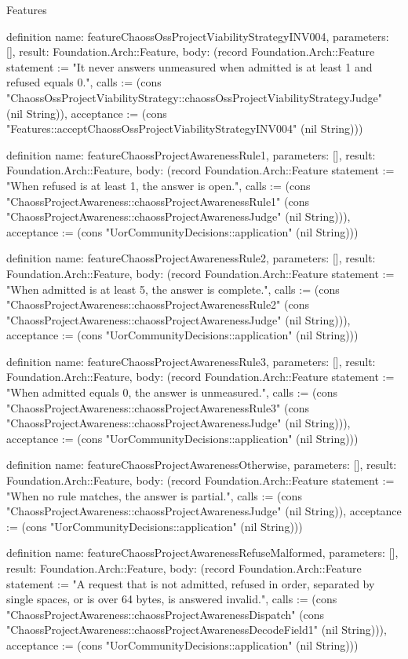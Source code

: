 \begin{lexlean}{Features}
\begin{semanticmodule}
definition{
  name: featureChaossOssProjectViabilityStrategyINV004,
  parameters: [],
  result: Foundation.Arch::Feature,
  body: (record Foundation.Arch::Feature {statement := "It never answers unmeasured when admitted is at least 1 and refused equals 0.", calls := (cons "ChaossOssProjectViabilityStrategy::chaossOssProjectViabilityStrategyJudge" (nil String)), acceptance := (cons "Features::acceptChaossOssProjectViabilityStrategyINV004" (nil String))})
}

definition{
  name: featureChaossProjectAwarenessRule1,
  parameters: [],
  result: Foundation.Arch::Feature,
  body: (record Foundation.Arch::Feature {statement := "When refused is at least 1, the answer is open.", calls := (cons "ChaossProjectAwareness::chaossProjectAwarenessRule1" (cons "ChaossProjectAwareness::chaossProjectAwarenessJudge" (nil String))), acceptance := (cons "UorCommunityDecisions::application" (nil String))})
}

definition{
  name: featureChaossProjectAwarenessRule2,
  parameters: [],
  result: Foundation.Arch::Feature,
  body: (record Foundation.Arch::Feature {statement := "When admitted is at least 5, the answer is complete.", calls := (cons "ChaossProjectAwareness::chaossProjectAwarenessRule2" (cons "ChaossProjectAwareness::chaossProjectAwarenessJudge" (nil String))), acceptance := (cons "UorCommunityDecisions::application" (nil String))})
}

definition{
  name: featureChaossProjectAwarenessRule3,
  parameters: [],
  result: Foundation.Arch::Feature,
  body: (record Foundation.Arch::Feature {statement := "When admitted equals 0, the answer is unmeasured.", calls := (cons "ChaossProjectAwareness::chaossProjectAwarenessRule3" (cons "ChaossProjectAwareness::chaossProjectAwarenessJudge" (nil String))), acceptance := (cons "UorCommunityDecisions::application" (nil String))})
}

definition{
  name: featureChaossProjectAwarenessOtherwise,
  parameters: [],
  result: Foundation.Arch::Feature,
  body: (record Foundation.Arch::Feature {statement := "When no rule matches, the answer is partial.", calls := (cons "ChaossProjectAwareness::chaossProjectAwarenessJudge" (nil String)), acceptance := (cons "UorCommunityDecisions::application" (nil String))})
}

definition{
  name: featureChaossProjectAwarenessRefuseMalformed,
  parameters: [],
  result: Foundation.Arch::Feature,
  body: (record Foundation.Arch::Feature {statement := "A request that is not admitted, refused in order, separated by single spaces, or is over 64 bytes, is answered invalid.", calls := (cons "ChaossProjectAwareness::chaossProjectAwarenessDispatch" (cons "ChaossProjectAwareness::chaossProjectAwarenessDecodeField1" (nil String))), acceptance := (cons "UorCommunityDecisions::application" (nil String))})
}


\end{semanticmodule}
\end{lexlean}
